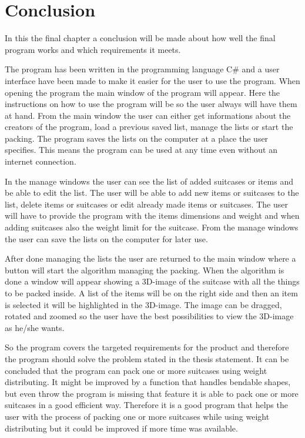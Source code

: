 \chapter{Conclusion}
In this the final chapter a conclusion will be made about how well the final program works and which requirements it meets.

The program has been written in the programming language C\# and a user interface have been made to make it easier for the user to use the program. When opening the program the main window of the program will appear. Here the instructions on how to use the program will be so the user always will have them at hand. From the main window the user can either get informations about the creators of the program, load a previous saved list, manage the lists or start the packing. The program saves the lists on the computer at a place the user specifies. This means the program can be used at any time even without an internet connection. 

In the manage windows the user can see the list of added suitcases or items and be able to edit the list. The user will be able to add new items or suitcases to the list, delete items or suitcases or edit already made items or suitcases. The user will have to provide the program with the items dimensions and weight and when adding suitcases also the weight limit for the suitcase. From the manage windows the user can save the lists on the computer for later use. 

After done managing the lists the user are returned to the main window where a button will start the algorithm managing the packing. When the algorithm is done a window will appear showing a 3D-image of the suitcase with all the things to be packed inside. A list of the items will be on the right side and then an item is selected it will be highlighted in the 3D-image. The image can be dragged, rotated and zoomed so the user have the best possibilities to view the 3D-image as he/she wants.

So the program covers the targeted requirements for the product and therefore the program should solve the problem stated in the thesis statement. It can be concluded that the program can pack one or more suitcases using weight distributing. It might be improved by a function that handles bendable shapes, but even throw the program is missing that feature it is able to pack one or more suitcases in a good efficient way. Therefore it is a good program that helps the user with the process of packing one or more suitcases while using weight distributing but it could be improved if more time was available. 